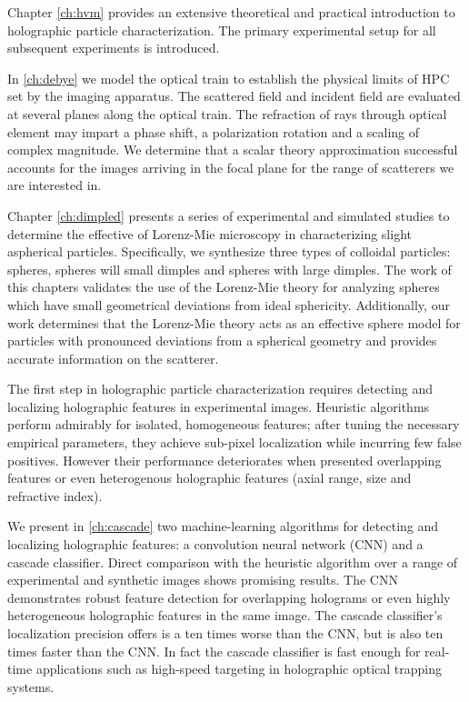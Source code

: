 Chapter \ref{ch:hvm} provides an extensive theoretical and practical
introduction to holographic particle characterization. The primary
experimental setup for all subsequent experiments is introduced.

In \autoref{ch:debye} we model the optical train to establish the
physical limits of HPC set by the imaging apparatus. The scattered
field and incident field are evaluated at several planes along the
optical train. The refraction of rays through optical element
may impart a phase shift, a polarization rotation and a scaling
of complex magnitude. We determine that a scalar theory
approximation successful accounts for the images arriving in the
focal plane for the range of scatterers we are interested in.

Chapter \ref{ch:dimpled} presents a series of experimental and
simulated studies to determine the effective of Lorenz-Mie
microscopy in characterizing slight aspherical particles.
Specifically, we synthesize three types of colloidal particles:
spheres, spheres will small dimples and spheres with large dimples.
The work of this chapters validates the use of the Lorenz-Mie theory
for analyzing spheres which have small geometrical deviations from
ideal sphericity. Additionally, our work determines that the Lorenz-Mie
theory acts as an effective sphere model for particles with
pronounced deviations from a spherical geometry and provides
accurate information on the scatterer.

The first step in holographic particle characterization
requires detecting and localizing holographic features in experimental
images. Heuristic algorithms perform admirably for isolated, homogeneous
features; after tuning the necessary empirical parameters, they achieve
sub-pixel localization while incurring few false positives. However their
performance deteriorates when presented overlapping features or even
heterogenous holographic features (axial range, size and refractive index).

We present in \autoref{ch:cascade} two machine-learning algorithms for
detecting and localizing holographic features: a convolution
neural network (CNN) and a cascade classifier. Direct comparison with the
heuristic algorithm over a range of experimental and synthetic images
shows promising results. The CNN demonstrates robust feature detection
for overlapping holograms or even highly heterogeneous holographic features
in the same image. The cascade classifier's localization precision
offers is a ten times worse than the CNN, but is also ten times faster than
the CNN. In fact the cascade classifier is fast enough for real-time
applications such as high-speed targeting in holographic optical
trapping systems.

